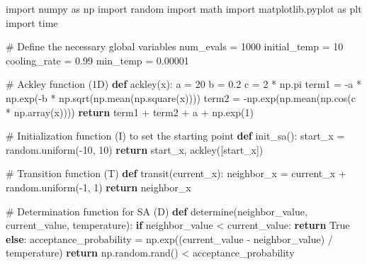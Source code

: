 \documentclass[
  letterpaper,
  DIV=11,
  numbers=noendperiod]{scrreprt}
\newenvironment{Shaded}{\begin{snugshade}}{\end{snugshade}}
\newcommand{\CommentTok}[1]{\textcolor[rgb]{0.37,0.37,0.37}{#1}}
\newcommand{\ControlFlowTok}[1]{\textcolor[rgb]{0.00,0.23,0.31}{\textbf{#1}}}
\newcommand{\DecValTok}[1]{\textcolor[rgb]{0.68,0.00,0.00}{#1}}
\newcommand{\FloatTok}[1]{\textcolor[rgb]{0.68,0.00,0.00}{#1}}
\newcommand{\ImportTok}[1]{\textcolor[rgb]{0.00,0.46,0.62}{#1}}
\newcommand{\KeywordTok}[1]{\textcolor[rgb]{0.00,0.23,0.31}{\textbf{#1}}}
\newcommand{\NormalTok}[1]{\textcolor[rgb]{0.00,0.23,0.31}{#1}}
\newcommand{\OperatorTok}[1]{\textcolor[rgb]{0.37,0.37,0.37}{#1}}
\newcommand{\VariableTok}[1]{\textcolor[rgb]{0.07,0.07,0.07}{#1}}
\begin{document}
\begin{Shaded}
\begin{Highlighting}[]
\ImportTok{import}\NormalTok{ numpy }\ImportTok{as}\NormalTok{ np}
\ImportTok{import}\NormalTok{ random}
\ImportTok{import}\NormalTok{ math}
\ImportTok{import}\NormalTok{ matplotlib.pyplot }\ImportTok{as}\NormalTok{ plt}
\ImportTok{import}\NormalTok{ time}

\CommentTok{\# Define the necessary global variables}
\NormalTok{num\_evals }\OperatorTok{=} \DecValTok{1000}
\NormalTok{initial\_temp }\OperatorTok{=} \DecValTok{10}
\NormalTok{cooling\_rate }\OperatorTok{=} \FloatTok{0.99}
\NormalTok{min\_temp }\OperatorTok{=} \FloatTok{0.00001}

\CommentTok{\# Ackley function (1D)}
\KeywordTok{def}\NormalTok{ ackley(x):}
\NormalTok{    a }\OperatorTok{=} \DecValTok{20}
\NormalTok{    b }\OperatorTok{=} \FloatTok{0.2}
\NormalTok{    c }\OperatorTok{=} \DecValTok{2} \OperatorTok{*}\NormalTok{ np.pi}
\NormalTok{    term1 }\OperatorTok{=} \OperatorTok{{-}}\NormalTok{a }\OperatorTok{*}\NormalTok{ np.exp(}\OperatorTok{{-}}\NormalTok{b }\OperatorTok{*}\NormalTok{ np.sqrt(np.mean(np.square(x))))}
\NormalTok{    term2 }\OperatorTok{=} \OperatorTok{{-}}\NormalTok{np.exp(np.mean(np.cos(c }\OperatorTok{*}\NormalTok{ np.array(x))))}
    \ControlFlowTok{return}\NormalTok{ term1 }\OperatorTok{+}\NormalTok{ term2 }\OperatorTok{+}\NormalTok{ a }\OperatorTok{+}\NormalTok{ np.exp(}\DecValTok{1}\NormalTok{)}

\CommentTok{\# Initialization function (I) to set the starting point}
\KeywordTok{def}\NormalTok{ init\_sa():}
\NormalTok{    start\_x }\OperatorTok{=}\NormalTok{ random.uniform(}\OperatorTok{{-}}\DecValTok{10}\NormalTok{, }\DecValTok{10}\NormalTok{)}
    \ControlFlowTok{return}\NormalTok{ start\_x, ackley([start\_x])}

\CommentTok{\# Transition function (T)}
\KeywordTok{def}\NormalTok{ transit(current\_x):}
\NormalTok{    neighbor\_x }\OperatorTok{=}\NormalTok{ current\_x }\OperatorTok{+}\NormalTok{ random.uniform(}\OperatorTok{{-}}\DecValTok{1}\NormalTok{, }\DecValTok{1}\NormalTok{)}
    \ControlFlowTok{return}\NormalTok{ neighbor\_x}

\CommentTok{\# Determination function for SA (D)}
\KeywordTok{def}\NormalTok{ determine(neighbor\_value, current\_value, temperature):}
    \ControlFlowTok{if}\NormalTok{ neighbor\_value }\OperatorTok{\textless{}}\NormalTok{ current\_value:}
        \ControlFlowTok{return} \VariableTok{True}
    \ControlFlowTok{else}\NormalTok{:}
\NormalTok{        acceptance\_probability }\OperatorTok{=}\NormalTok{ np.exp((current\_value }\OperatorTok{{-}}\NormalTok{ neighbor\_value) }\OperatorTok{/}\NormalTok{ temperature)}
        \ControlFlowTok{return}\NormalTok{ np.random.rand() }\OperatorTok{\textless{}}\NormalTok{ acceptance\_probability}


\end{Highlighting}
\end{Shaded}
\end{document}
